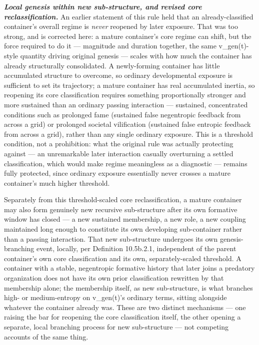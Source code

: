 \documentclass[
]{article}
\begin{document}
\emph{\textbf{Local genesis within new sub-structure, and revised core
reclassification.}} An earlier statement of this rule held that an
already-classified container's overall regime is \emph{never} reopened
by later exposure. That was too strong, and is corrected here: a mature
container's core regime can shift, but the force required to do it ---
magnitude and duration together, the same v\_gen(t)-style quantity
driving original genesis --- scales with how much the container has
already structurally consolidated. A newly-forming container has little
accumulated structure to overcome, so ordinary developmental exposure is
sufficient to set its trajectory; a mature container has real
accumulated inertia, so reopening its core classification requires
something proportionally stronger and more sustained than an ordinary
passing interaction --- sustained, concentrated conditions such as
prolonged fame (sustained false negentropic feedback from across a grid)
or prolonged societal vilification (sustained false entropic feedback
from across a grid), rather than any single ordinary exposure. This is a
threshold condition, not a prohibition: what the original rule was
actually protecting against --- an unremarkable later interaction
casually overturning a settled classification, which would make regime
meaningless as a diagnostic --- remains fully protected, since ordinary
exposure essentially never crosses a mature container's much higher
threshold.

Separately from this threshold-scaled core reclassification, a mature
container may also form genuinely new recursive sub-structure after its
own formative window has closed --- a new sustained membership, a new
role, a new coupling maintained long enough to constitute its own
developing sub-container rather than a passing interaction. That new
sub-structure undergoes its own genesis-branching event, locally, per
Definition 10.5b.2.1, independent of the parent container's own core
classification and its own, separately-scaled threshold. A container
with a stable, negentropic formative history that later joins a
predatory organization does not have its own prior classification
rewritten by that membership alone; the membership itself, as new
sub-structure, is what branches high- or medium-entropy on v\_gen(t)'s
ordinary terms, sitting alongside whatever the container already was.
These are two distinct mechanisms --- one raising the bar for reopening
the core classification itself, the other opening a separate, local
branching process for new sub-structure --- not competing accounts of
the same thing.
\end{document}
